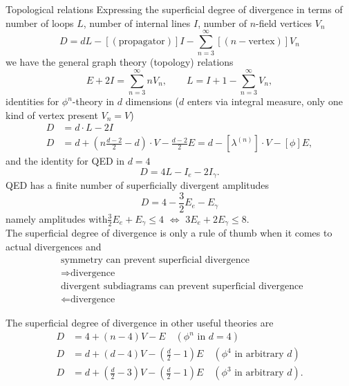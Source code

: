 


\begin{mybox}{Topological relations}
	Expressing the superficial degree of divergence in terms of number of loops $L$, number of internal lines $I$, number of $n$-field vertices $V_n$
	\begin{equation}
		D = dL - [(\text{propagator})] I - \sum_{n=3}^{\infty} [(n-\text{vertex})] V_n
	\end{equation}
	we have the general graph theory (topology) relations
	\begin{equation}
		E+2I = \sum_{n=3}^{\infty} n V_n,\qquad L = I+1-\sum_{n=3}^{\infty}V_n,
	\end{equation}
	 identities for $\phi^n$-theory in $d$ dimensions ($d$ enters via integral measure, only one kind of vertex present $V_n=V$)
	\begin{align}
		D&= d \cdot L - 2I\\
		D&= d + \left(n\frac{d-2}{2}-d\right) \cdot V-\frac{d-2}{2} E = d - [\lambda^{(n)}] \cdot V - [\phi] E,
	\end{align}
and the identity for QED in $d=4$
\begin{equation}
	D=4L-I_e-2I_\gamma.
\end{equation}
QED has a finite number of superficially divergent amplitudes
\begin{equation}
D=4-\frac{3}{2}E_e-E_\gamma
\end{equation}
namely amplitudes with$\frac{3}{2}E_e+E_\gamma \leq 4$ $\Leftrightarrow$ $3 E_e+2 E_\gamma \leq 8$.\\
The superficial degree of divergence is only a rule of thumb when it comes to actual divergences and 
\begin{align}
	&\text{symmetry can prevent superficial divergence }\nonumber \\
	&\Rightarrow \text{divergence}\\
	&\text{divergent subdiagrams can prevent superficial divergence }\nonumber \\
	& \Leftarrow \text{divergence}
\end{align}
\end{mybox}
The superficial degree of divergence in other useful theories are
\begin{align}
	D&= 4+(n-4)V-E \quad (\phi^n \text{ in } d=4) \\
	D&= d+(d-4)V-(\frac{d}{2}-1) E \quad (\phi^4 \text{ in arbitrary } d) \\
	D&= d+(\frac{d}{2} -3)V-(\frac{d}{2}-1)E \quad (\phi^3 \text{ in arbitrary } d).
\end{align}
